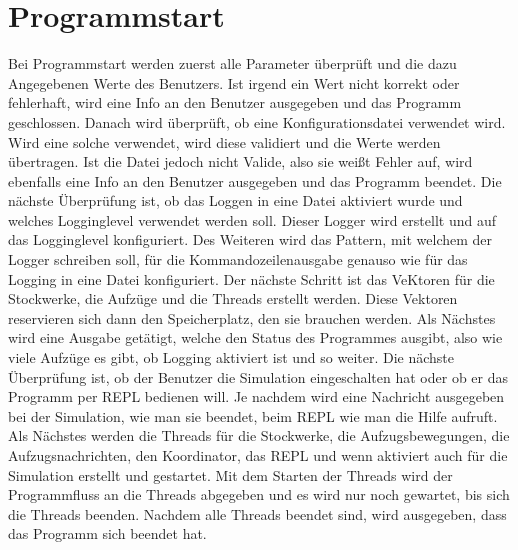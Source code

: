 \documentclass[a4paper,12pt,titlepage]{scrartcl}
\begin{document}
\break















\section{Programmstart}

Bei Programmstart werden zuerst alle Parameter überprüft und die dazu Angegebenen Werte des Benutzers. Ist irgend ein Wert nicht korrekt oder fehlerhaft, wird eine Info an den Benutzer ausgegeben und das Programm geschlossen. Danach wird überprüft, ob eine Konfigurationsdatei verwendet wird. Wird eine solche verwendet, wird diese validiert und die Werte werden übertragen. Ist die Datei jedoch nicht Valide, also sie weißt Fehler auf, wird ebenfalls eine Info an den Benutzer ausgegeben und das Programm beendet. Die nächste Überprüfung ist, ob das Loggen in eine Datei aktiviert wurde und welches Logginglevel verwendet werden soll. Dieser Logger wird erstellt und auf das Logginglevel konfiguriert. Des Weiteren wird das Pattern, mit welchem der Logger schreiben soll, für die Kommandozeilenausgabe genauso wie für das Logging in eine Datei konfiguriert. Der nächste Schritt ist das VeKtoren für die Stockwerke, die Aufzüge und die Threads erstellt werden. Diese Vektoren reservieren sich dann den Speicherplatz, den sie brauchen werden. Als Nächstes wird eine Ausgabe getätigt, welche den Status des Programmes ausgibt, also wie viele Aufzüge es gibt, ob Logging aktiviert ist und so weiter. Die nächste Überprüfung ist, ob der Benutzer die Simulation eingeschalten hat oder ob er das Programm per REPL bedienen will. Je nachdem wird eine Nachricht ausgegeben bei der Simulation, wie man sie beendet, beim REPL wie man die Hilfe aufruft. Als Nächstes werden die Threads für die Stockwerke, die Aufzugsbewegungen, die Aufzugsnachrichten, den Koordinator, das REPL und wenn aktiviert auch für die Simulation erstellt und gestartet. Mit dem Starten der Threads wird der Programmfluss an die Threads abgegeben und es wird nur noch gewartet, bis sich die Threads beenden. Nachdem alle Threads beendet sind, wird ausgegeben, dass das Programm sich beendet hat.
\end{document}
